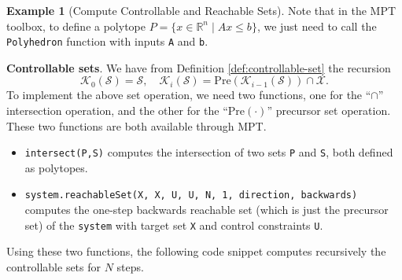 \documentclass[
]{book}
\theoremstyle{definition}
\theoremstyle{definition}
\newtheorem{example}{Example}[chapter]
\theoremstyle{definition}
\theoremstyle{definition}
\theoremstyle{remark}
\begin{document}
\begin{example}[Compute Controllable and Reachable Sets]
Note that in the MPT toolbox, to define a polytope \(P = \{ x \in \mathbb{R}^n \mid A x \leq b \}\), we just need to call the \texttt{Polyhedron} function with inputs \texttt{A} and \texttt{b}.

\textbf{Controllable sets}. We have from Definition \ref{def:controllable-set} the recursion
\[
\mathcal{K}_0(\mathcal{S}) = \mathcal{S}, \quad \mathcal{K}_i(\mathcal{S}) = \text{Pre}(\mathcal{K}_{i-1}(\mathcal{S})) \cap \mathcal{X}.
\]
To implement the above set operation, we need two functions, one for the ``\(\cap\)'' intersection operation, and the other for the ``\(\text{Pre}(\cdot)\)'' precursor set operation. These two functions are both available through MPT.

\begin{itemize}
\item
  \texttt{intersect(P,S)} computes the intersection of two sets \texttt{P} and \texttt{S}, both defined as polytopes.
\item
  \texttt{system.reachableSet(\textquotesingle{}X\textquotesingle{},\ X,\ \textquotesingle{}U\textquotesingle{},\ U,\ \textquotesingle{}N\textquotesingle{},\ 1,\ \textquotesingle{}direction\textquotesingle{},\ \textquotesingle{}backwards\textquotesingle{})} computes the one-step backwards reachable set (which is just the precursor set) of the \texttt{system} with target set \texttt{X} and control constraints \texttt{U}.
\end{itemize}

Using these two functions, the following code snippet computes recursively the controllable sets for \(N\) steps.


\end{example}
\end{document}
